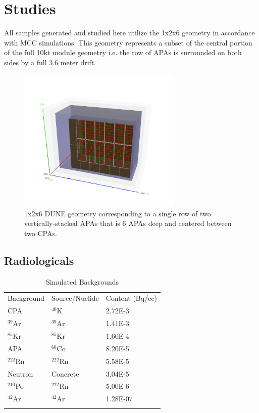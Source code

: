 \documentclass[10pt]{article}
\newcommand{\rowtitlestyle}{
  \rowcolor{lightblue}
}
\newcommand{\colhline}{
  \arrayrulecolor{gray}
  \specialrule{0.5pt}{0pt}{1pt}
  \arrayrulecolor{black}
}
\newcommand{\toprowrule}{
  \arrayrulecolor{gray}
  \specialrule{1.2pt}{0pt}{1pt}
  \arrayrulecolor{black}
}
\begin{document}
\section{Studies}

All samples generated and studied here utilize the 1x2x6 geometry in accordance with MCC simulations. This geometry represents a subset of the central portion of the full 10kt module geometry i.e. the row of APAs is surrounded on both sides by a full 3.6 meter drift. 

\begin{figure}[H]
    \centering
    \includegraphics[width=0.7\textwidth]{dune_1x2x6_full_axes_test.png}
    \caption{1x2x6 DUNE geometry corresponding to a single row of two vertically-stacked APAs that is 6 APAs deep and centered between two CPAs.}
    \label{fig:geom}
\end{figure}

\subsection{Radiologicals}

\begin{table}[h!]
\begin{center}
\caption{Simulated Backgrounds}
\begin{tabular}{ |l|l|l| }
  \toprule
  \rowtitlestyle Background & Source/Nuclide & Content (Bq/cc) \\ 
  \toprowrule 
  CPA & $^{40}$K &2.72E-3 \\ \colhline
  $^{39}$Ar & $^{39}$Ar & 1.41E-3 \\ \colhline
  $^{85}$Kr &$^{85}$Kr &  1.60E-4 \\ \colhline
  APA & $^{60}$Co & 8.20E-5 \\ \colhline
  $^{222}$Rn & $^{222}$Rn & 5.58E-5 \\ \colhline
  Neutron & Concrete & 3.04E-5 \\ \colhline
  $^{210}$Po & $^{222}$Rn & 5.00E-6 \\ \colhline
  $^{42}$Ar & $^{42}$Ar & 1.28E-07 \\ \colhline
\end{tabular}
\label{tab:bkg}
\end{center}
\end{table}
\end{document}
